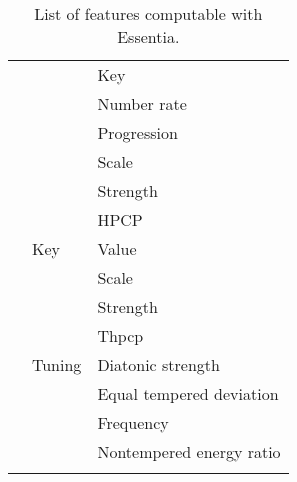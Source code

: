 \begin{center}
\begin{longtable}{ p{} p{} p{} }
& & Key \\ \cmidrule(r){3-3}
& & Number rate \\ \cmidrule(r){3-3}
& & Progression \\ \cmidrule(r){3-3}
& & Scale \\ \cmidrule(r){3-3}
& & Strength \\ \cmidrule(r){3-3}
& & HPCP \\ \cmidrule(r){2-3}
& Key & Value \\ \cmidrule(r){3-3}
& & Scale \\ \cmidrule(r){3-3}
& & Strength \\ \cmidrule(r){3-3}
& & Thpcp \\ \cmidrule(r){2-3}
& Tuning & Diatonic strength \\ \cmidrule(r){3-3}
& & Equal tempered deviation \\ \cmidrule(r){3-3}
& & Frequency \\ \cmidrule(r){3-3}
& & Nontempered energy ratio \\ \bottomrule

\caption[List of features computable with Essentia]{List of features computable with Essentia.}
\label{table:essentiaFeatures}
\end{longtable}
\end{center}